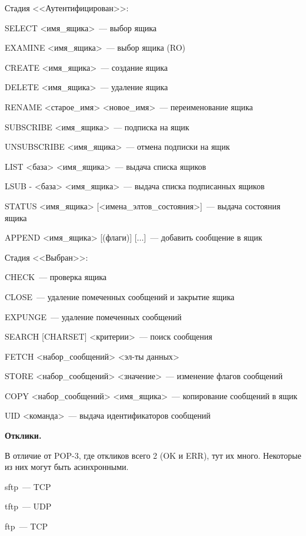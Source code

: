 Стадия <<Аутентифицирован>>:
\begin{MyItemize}
    \item SELECT <имя\_ящика>~--- выбор ящика
    \item EXAMINE <имя\_ящика>~--- выбор ящика (RO)
    \item CREATE <имя\_ящика>~--- создание ящика
    \item DELETE <имя\_ящика>~--- удаление ящика
    \item RENAME <старое\_имя> <новое\_имя>~--- переименование ящика
    \item SUBSCRIBE <имя\_ящика>~--- подписка на ящик
    \item UNSUBSCRIBE <имя\_ящика>~--- отмена подписки на ящик
    \item LIST <база> <имя\_ящика>~--- выдача списка ящиков
    \item LSUB - <база> <имя\_ящика>~--- выдача списка подписанных ящиков
    \item STATUS <имя\_ящика> [<имена\_элтов\_состояния>]~--- выдача состояния ящика
    \item APPEND <имя\_ящика> [(флаги)] [...]~--- добавить сообщение в ящик
\end{MyItemize}

Стадия <<Выбран>>:
\begin{MyItemize}
    \item CHECK~--- проверка ящика
    \item CLOSE~--- удаление помеченных сообщений и закрытие ящика
    \item EXPUNGE~--- удаление помеченных сообщений
    \item SEARCH [CHARSET] <критерии>~--- поиск сообщения
    \item FETCH <набор\_сообщений> <эл-ты данных>
    \item STORE <набор\_сообщений> <значение>~--- изменение флагов сообщений
    \item COPY <набор\_сообщений> <имя\_ящика>~--- копирование сообщений в ящик
    \item UID <команда>~--- выдача идентификаторов сообщений
\end{MyItemize}

{\bf Отклики.}

В отличие от POP-3, где откликов всего 2 (OK и ERR), тут их много. Некоторые из них могут быть асинхронными.


\begin{MyItemize}
    \item sftp~--- TCP
    \item tftp~--- UDP
    \item ftp~--- TCP
\end{MyItemize}

